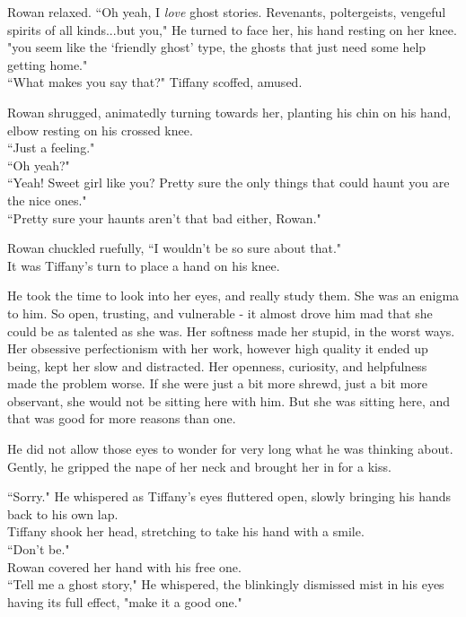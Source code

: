 Rowan relaxed.
``Oh yeah, I \textit{love} ghost stories. Revenants, poltergeists, vengeful spirits of all kinds...but you,"
He turned to face her, his hand resting on her knee.
"you seem like the `friendly ghost' type, the ghosts that just need some help getting home."\\
``What makes you say that?" Tiffany scoffed, amused.
\vspace{5mm}

Rowan shrugged, animatedly turning towards her, planting his chin on his hand, elbow resting on his crossed knee.\\
``Just a feeling."\\
``Oh yeah?"\\
``Yeah! Sweet girl like you? Pretty sure the only things that could haunt you are the nice ones."\\
``Pretty sure your haunts aren't that bad either, Rowan."
\vspace{5mm}

Rowan chuckled ruefully, ``I wouldn't be so sure about that."\\
It was Tiffany's turn to place a hand on his knee.
\vspace{5mm}

He took the time to look into her eyes, and really study them. 
She was an enigma to him. 
So open, trusting, and vulnerable - it almost drove him mad that she could be as talented as she was. 
Her softness made her stupid, in the worst ways.
Her obsessive perfectionism with her work, however high quality it ended up being, kept her slow and distracted. 
Her openness, curiosity, and helpfulness made the problem worse.
If she were just a bit more shrewd, just a bit more observant, she would not be sitting here with him.
But she was sitting here, and that was good for more reasons than one.
\vspace{5mm}

He did not allow those eyes to wonder for very long what he was thinking about. 
Gently, he gripped the nape of her neck and brought her in for a kiss.
\vspace{5mm}

``Sorry." He whispered as Tiffany's eyes fluttered open, slowly bringing his hands back to his own lap.\\
Tiffany shook her head, stretching to take his hand with a smile.\\
``Don't be."\\
Rowan covered her hand with his free one.\\
``Tell me a ghost story," He whispered, the blinkingly dismissed mist in his eyes having its full effect, "make it a good one."
\vspace{5mm}

